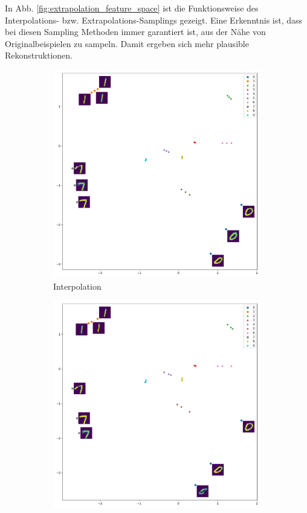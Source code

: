 In Abb. \ref{fig:extrapolation_feature_space} ist die Funktionsweise des Interpolations- bzw. Extrapolations-Samplings gezeigt. Eine Erkenntnis ist, dass bei diesen Sampling Methoden immer garantiert ist, aus der Nähe von Originalbeispielen zu sampeln. Damit ergeben sich mehr plausible Rekonstruktionen. \\
\begin{figure}[hbt]
\centering
\begin{subfigure}{.5\textwidth}
  \centering
  \includegraphics[width=\textwidth]{gfx/evaluation/feature_space/interpolation}
  \caption{Interpolation}
\end{subfigure}%
\begin{subfigure}{.5\textwidth}
  \centering
  \includegraphics[width=\textwidth]{gfx/evaluation/feature_space/extrapolation}

\end{subfigure}
\end{figure}

